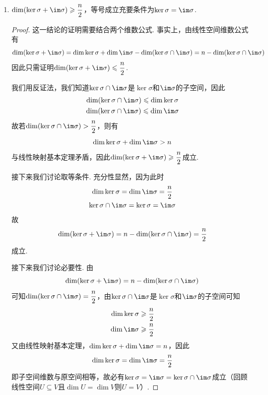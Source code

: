 \begin{enumerate}
    \item $\dim(\ker\sigma+\im \sigma) \geqslant \dfrac{n}{2}$，等号成立充要条件为$\ker\sigma=\im \sigma$.

          \begin{proof}
              这一结论的证明需要结合两个维数公式. 事实上，由线性空间维数公式有
              \[\dim(\ker\sigma+\im \sigma)=\dim\ker\sigma+\dim\im \sigma-\dim(\ker\sigma \cap \im \sigma)=n-\dim(\ker\sigma \cap \im \sigma)\]
              因此只需证明$\dim(\ker\sigma+\im \sigma) \leqslant \dfrac{n}{2}$.

              我们用反证法，我们知道$\ker\sigma\cap \im \sigma$是$\ker\sigma$和$\im\sigma$的子空间，因此
              \begin{gather*}
                  \dim(\ker\sigma\cap \im \sigma) \leqslant \dim\ker\sigma \\
                  \dim(\ker\sigma\cap \im \sigma) \leqslant \dim\im\sigma
              \end{gather*}
              故若$\dim(\ker\sigma\cap \im \sigma)>\dfrac{n}{2}$，则有
              \[\dim\ker\sigma+\dim\im \sigma>n\]
              与线性映射基本定理矛盾，因此$\dim(\ker\sigma+\im \sigma) \geqslant \dfrac{n}{2}$成立.

              接下来我们讨论取等条件. 充分性显然，因为此时
              \begin{gather*}
                  \dim\ker\sigma=\dim\im\sigma=\dfrac{n}{2} \\
                  \ker\sigma\cap \im \sigma=\ker\sigma=\im\sigma
              \end{gather*}
              故
              \[\dim(\ker\sigma+\im \sigma)=n-\dim(\ker\sigma \cap \im \sigma)=\dfrac{n}{2}\]
              成立.

              接下来我们讨论必要性. 由
              \[\dim(\ker\sigma+\im \sigma)=n-\dim(\ker\sigma \cap \im \sigma)\]
              可知$\dim(\ker\sigma\cap \im \sigma)=\dfrac{n}{2}$，由$\ker\sigma\cap \im \sigma$是$\ker\sigma$和$\im\sigma$的子空间可知
              \begin{align*}
                  \dim\ker\sigma & \geqslant\dfrac{n}{2} \\
                  \dim\im \sigma & \geqslant\dfrac{n}{2}
              \end{align*}
              又由线性映射基本定理，$\dim\ker\sigma+\dim\im \sigma=n$，因此
              \[\dim\ker\sigma=\dim\im \sigma=\dfrac{n}{2}\]
              即子空间维数与原空间相等，故必有$\ker\sigma=\im \sigma=\ker\sigma\cap \im \sigma$成立（回顾线性空间$U\subseteq V$且$\dim U=\dim V$则$U=V$）.
          \end{proof}
\end{enumerate}


